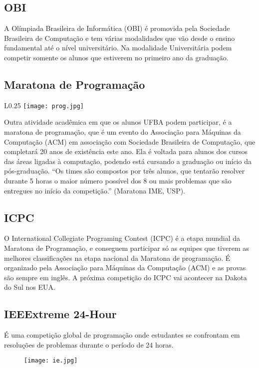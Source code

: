     \subsection{OBI}
        \par A Olímpiada Brasileira de Informática (OBI) é promovida pela Sociedade Brasileira de Computação e tem várias modalidades que vão desde o ensino fundamental até o nível universitário. Na modalidade Universitária podem competir somente os alunos que estiverem no primeiro ano da graduação.
        
    \subsection{Maratona de Programação}
    
        \begin{wrapfigure}{L}{0.25\textwidth}
            \centering
            \texttt{[image: prog.jpg]}
        \end{wrapfigure}
        \par Outra atividade acadêmica em que os alunos UFBA podem participar, é a maratona de programação, que é um evento do Associação para Máquinas da Computação (ACM) em associação com Sociedade Brasileira de Computação, que completará 20 anos de existência este ano. Ela é voltada para alunos dos cursos das áreas ligadas à computação, podendo está cursando a graduação ou início da pós-graduação. ``Os times são compostos por três alunos, que tentarão resolver durante 5 horas o maior número possível dos 8 ou mais problemas que são entregues no início da competição.'' (Maratona IME, USP).
        
    \subsection{ICPC}
        \par O International Collegiate Programing Contest (ICPC) é a etapa mundial da Maratona de Programação, e conseguem participar só as equipes que tiverem as melhores classificações na etapa nacional da Maratona de programação. É organizado pela Associação para Máquinas da Computação (ACM) e as provas são sempre em inglês. A próxima competição do ICPC vai acontecer na Dakota do Sul nos EUA.
       
    \subsection{IEEExtreme 24-Hour}
        \par É uma competição global de programação onde estudantes se confrontam em resoluções de problemas durante o período de 24 horas.
        \begin{figure}[!htb]
            \centering
            \texttt{[image: ie.jpg]}
        \end{figure}

